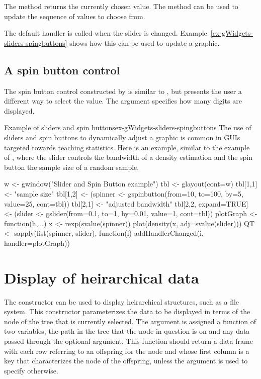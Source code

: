 The  method returns the currently chosen  value. The \method{[\ASSIGN}{gslider} method can be used to update the sequence of values to choose from.

The default handler is called when the slider is changed. Example~\ref{ex-gWidgets-sliders-spingbuttons}
shows how this can be used to update a graphic.


\subsection{A spin button control}
\label{sec:gWidgets-spin-button-control}

The spin button control constructed by  is
similar to  , but presents the user a different
way to select the value. The argument 
specifies how many digits are displayed. 

\begin{example}{Example of sliders and spin buttons}{ex-gWidgets-sliders-spingbuttons}
  The use of sliders and spin buttons to dynamically adjust a graphic
  is common in \R\/ GUIs targeted towards teaching statistics. Here is
  an example, similar to the  example of ,
  where the slider controls the bandwidth of a density estimation and
  the spin button the sample size of a random sample.
\begin{Schunk}
\begin{Sinput}
 w <- gwindow("Slider and Spin Button example") 
 tbl <- glayout(cont=w)
 tbl[1,1] <- "sample size"
 tbl[1,2] <- (spinner <- gspinbutton(from=10, to=100, by=5, 
                                     value=25, cont=tbl))
 tbl[2,1] <- "adjusted bandwidth"
 tbl[2,2, expand=TRUE] <- (slider <- gslider(from=0.1, to=1, 
            by=0.01, value=1, cont=tbl))
 plotGraph <- function(h,...) {
   x <- rexp(svalue(spinner))
   plot(density(x, adj=svalue(slider)))
 }
 QT <- sapply(list(spinner, slider), function(i) 
   addHandlerChanged(i, handler=plotGraph))
\end{Sinput}
\end{Schunk}
\end{example}


\section{Display of heirarchical data}
\label{sec:gWidgets-displ-heir-data}

The  constructor can be used to display
heirarchical structures, such as a file system. This constructor
parameterizes the data to be displayed in terms of the node of the
tree that is currently selected. The 
argument is assigned a function of two variables, the path in the tree
that the node in question is on and any data passed through the
optional  argument. This function
should return a data frame with each row referring to an offspring for
the node and whose first column is a key that characterizes the node
of the offspring, unless the argument  is
used to specify otherwise.

